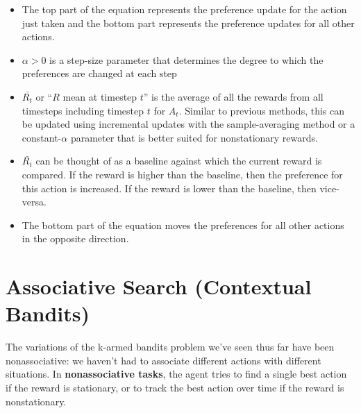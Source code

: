 \begin{itemize}
    \item The top part of the equation represents the preference update for the action just taken and the bottom part represents the preference updates for all other actions.
    \item $\alpha > 0$ is a step-size parameter that determines the degree to which the preferences are changed at each step
    \item $\bar{R_t}$ or “$R$ mean at timestep $t$” is the average of all the rewards from all timesteps including timestep $t$ for $A_t$. Similar to previous methods, this can be updated using incremental updates with the sample-averaging method or a constant-$\alpha$ parameter that is better suited for nonstationary rewards.
    \item $\bar{R_t}$ can be thought of as a baseline against which the current reward is compared. If the reward is higher than the baseline, then the preference for this action is increased. If the reward is lower than the baseline, then vice-versa.
    \item The bottom part of the equation moves the preferences for all other actions in the opposite direction.
\end{itemize}


\section{Associative Search (Contextual Bandits) \cite{medium-numsmt2-rl-ch2-part-6, kaggle-parsasam-reinforcement-learning-notes-multi-armed-bandits}}\label{Associative Search (Contextual Bandits)}

The variations of the k-armed bandits problem we’ve seen thus far have been nonassociative: we haven’t had to associate different actions with different situations. In \textbf{nonassociative tasks}, the agent tries to find a single best action if the reward is stationary, or to track the best action over time if the reward is nonstationary.

